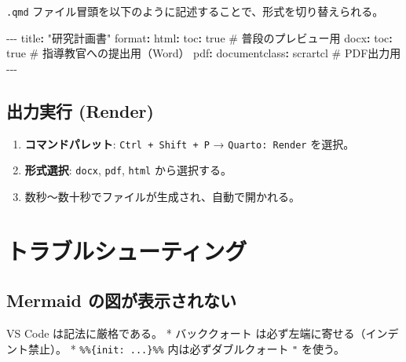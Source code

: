 \documentclass[
  pandoc]{bxjsarticle}
\newenvironment{Shaded}{\begin{snugshade}}{\end{snugshade}}
\newcommand{\AttributeTok}[1]{\textcolor[rgb]{0.40,0.45,0.13}{#1}}
\newcommand{\CharTok}[1]{\textcolor[rgb]{0.13,0.47,0.30}{#1}}
\newcommand{\CommentTok}[1]{\textcolor[rgb]{0.37,0.37,0.37}{#1}}
\newcommand{\FunctionTok}[1]{\textcolor[rgb]{0.28,0.35,0.67}{#1}}
\newcommand{\KeywordTok}[1]{\textcolor[rgb]{0.00,0.23,0.31}{\textbf{#1}}}
\newcommand{\PreprocessorTok}[1]{\textcolor[rgb]{0.68,0.00,0.00}{#1}}
\newcommand{\StringTok}[1]{\textcolor[rgb]{0.13,0.47,0.30}{#1}}
\providecommand{\tightlist}{%
  \setlength{\itemsep}{0pt}\setlength{\parskip}{0pt}}
\begin{document}
\texttt{.qmd}
ファイル冒頭を以下のように記述することで、形式を切り替えられる。

\begin{Shaded}
\begin{Highlighting}[]
\PreprocessorTok{{-}{-}{-}}
\FunctionTok{title}\KeywordTok{:}\AttributeTok{ }\StringTok{"研究計画書"}
\FunctionTok{format}\KeywordTok{:}
\AttributeTok{  }\FunctionTok{html}\KeywordTok{:}
\AttributeTok{    }\FunctionTok{toc}\KeywordTok{:}\AttributeTok{ }\CharTok{true}\CommentTok{       \# 普段のプレビュー用}
\AttributeTok{  }\FunctionTok{docx}\KeywordTok{:}
\AttributeTok{    }\FunctionTok{toc}\KeywordTok{:}\AttributeTok{ }\CharTok{true}\CommentTok{       \# 指導教官への提出用（Word）}
\AttributeTok{  }\FunctionTok{pdf}\KeywordTok{:}
\AttributeTok{    }\FunctionTok{documentclass}\KeywordTok{:}\AttributeTok{ scrartcl}\CommentTok{ \# PDF出力用}
\PreprocessorTok{{-}{-}{-}}
\end{Highlighting}
\end{Shaded}

\subsection{出力実行 (Render)}\label{ux51faux529bux5b9fux884c-render}

\begin{enumerate}
\def\labelenumi{\arabic{enumi}.}
\tightlist
\item
  \textbf{コマンドパレット}: \texttt{Ctrl\ +\ Shift\ +\ P} →
  \texttt{Quarto:\ Render} を選択。
\item
  \textbf{形式選択}: \texttt{docx}, \texttt{pdf}, \texttt{html}
  から選択する。
\item
  数秒〜数十秒でファイルが生成され、自動で開かれる。
\end{enumerate}

\section{トラブルシューティング}\label{ux30c8ux30e9ux30d6ux30ebux30b7ux30e5ux30fcux30c6ux30a3ux30f3ux30b0}

\subsection{Mermaid
の図が表示されない}\label{mermaid-ux306eux56f3ux304cux8868ux793aux3055ux308cux306aux3044}

VS Code は記法に厳格である。 * バッククォート
\texttt{\textasciigrave{}\textasciigrave{}\textasciigrave{}}
は必ず左端に寄せる（インデント禁止）。 * \texttt{\%\%\{init:\ ...\}\%\%}
内は必ずダブルクォート \texttt{"} を使う。
\end{document}
